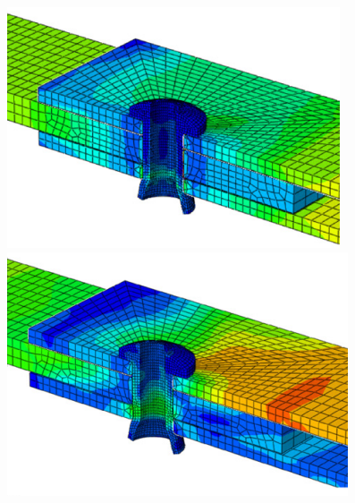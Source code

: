 \documentclass[
documentsize = a4, %
font = cmr, %
typesize = 11, %
printmode = true,
onehalfspacing = true,
language = en, %
titlepage = udciccp, %
degree = pt, %
dedication = true,
acknowledgements = true,
abstract-en = true,
abstract-es = false,
abstract-ga = false,
epigraphs = true,
toc = true,
lof = true,
lot = true,
frontmatterintoc = false,
notation = false,
minimal = false,
]{UDCthesis}
\begin{document}
\begin{itemize}
	\begin{figure}
		\centering
		\begin{minipage}[b]{.2\linewidth}
			\centering
			\includegraphics[width=\linewidth]{IMG_CUTRES/sadowski_riv1}
		\end{minipage}
		\quad
		\begin{minipage}[b]{.2\linewidth}
			\centering
			\includegraphics[width=\linewidth]{IMG_CUTRES/sadowski_riv2}
		\end{minipage}
		\quad
		\begin{minipage}[b]{.2\linewidth}
			\centering

\end{minipage}
\end{figure}
\end{itemize}
\end{document}
